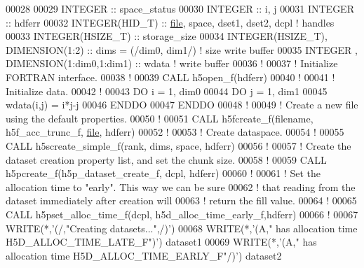 \begin{DoxyCode}
00028 
00029   \textcolor{keywordtype}{INTEGER} :: space\_status
00030   \textcolor{keywordtype}{INTEGER} :: i, j
00031   \textcolor{keywordtype}{INTEGER} :: hdferr
00032   \textcolor{keywordtype}{INTEGER(HID\_T)}   :: \hyperlink{structfile}{file}, space, dset1, dset2, dcpl \textcolor{comment}{! handles}
00033   \textcolor{keywordtype}{INTEGER(HSIZE\_T)} :: storage\_size
00034   \textcolor{keywordtype}{INTEGER(HSIZE\_T)}, \textcolor{keywordtype}{DIMENSION(1:2)}           :: dims = (/dim0, dim1/) \textcolor{comment}{! size write buffer}
00035   \textcolor{keywordtype}{INTEGER}         , \textcolor{keywordtype}{DIMENSION(1:dim0,1:dim1)} :: wdata \textcolor{comment}{! write buffer}
00036   \textcolor{comment}{!}
00037   \textcolor{comment}{! Initialize FORTRAN interface.}
00038   \textcolor{comment}{!}
00039   \textcolor{keyword}{CALL }h5open\_f(hdferr)
00040   \textcolor{comment}{!}
00041   \textcolor{comment}{! Initialize data.}
00042   \textcolor{comment}{!}
00043   \textcolor{keywordflow}{DO} i = 1, dim0
00044      \textcolor{keywordflow}{DO} j = 1, dim1
00045         wdata(i,j) = i*j-j
00046 \textcolor{keywordflow}{     ENDDO}
00047 \textcolor{keywordflow}{  ENDDO}
00048   \textcolor{comment}{!}
00049   \textcolor{comment}{! Create a new file using the default properties.}
00050   \textcolor{comment}{!}
00051   \textcolor{keyword}{CALL }h5fcreate\_f(filename, h5f\_acc\_trunc\_f, \hyperlink{structfile}{file}, hdferr)
00052   \textcolor{comment}{!}
00053   \textcolor{comment}{! Create dataspace. }
00054   \textcolor{comment}{!}
00055   \textcolor{keyword}{CALL }h5screate\_simple\_f(rank, dims, space, hdferr)
00056   \textcolor{comment}{!}
00057   \textcolor{comment}{! Create the dataset creation property list, and set the chunk size.}
00058   \textcolor{comment}{!}
00059   \textcolor{keyword}{CALL }h5pcreate\_f(h5p\_dataset\_create\_f, dcpl, hdferr)
00060   \textcolor{comment}{!}
00061   \textcolor{comment}{! Set the allocation time to "early".  This way we can be sure}
00062   \textcolor{comment}{! that reading from the dataset immediately after creation will}
00063   \textcolor{comment}{! return the fill value.}
00064   \textcolor{comment}{!}
00065   \textcolor{keyword}{CALL }h5pset\_alloc\_time\_f(dcpl, h5d\_alloc\_time\_early\_f,hdferr)
00066   \textcolor{comment}{!}
00067   \textcolor{keyword}{WRITE}(*,\textcolor{stringliteral}{'(/,"Creating datasets...",/)'}) 
00068   \textcolor{keyword}{WRITE}(*,\textcolor{stringliteral}{'(A," has allocation time H5D\_ALLOC\_TIME\_LATE\_F")'}) dataset1
00069   \textcolor{keyword}{WRITE}(*,\textcolor{stringliteral}{'(A," has allocation time H5D\_ALLOC\_TIME\_EARLY\_F"/)'}) dataset2

\end{DoxyCode}
